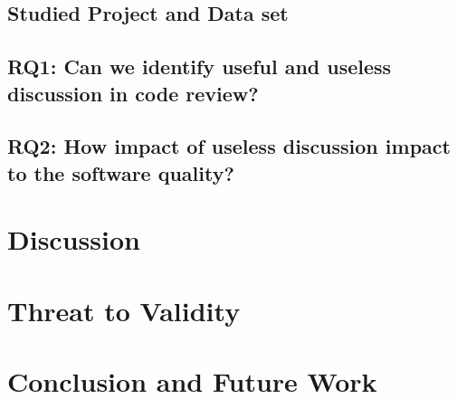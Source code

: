 \documentclass[conference]{IEEEtran}
\begin{document}



\subsection{Studied Project and Data set}
\subsection{RQ1: Can we identify useful and useless discussion in code review?}
\subsection{RQ2: How impact of useless discussion impact to the software quality?}


\section{Discussion}



\section{Threat to Validity}


\section{Conclusion and Future Work}


\IEEEpeerreviewmaketitle







\end{document}
